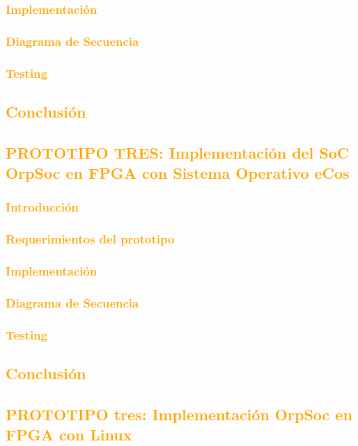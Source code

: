 \documentclass[a4paper,11pt]{article}
\begin{document}
		\subsubsection{\textcolor{orange}{Implementación}}
			\subsubsection{\textcolor{orange}{Diagrama de Secuencia}}
			\subsubsection{\textcolor{orange}{Testing}}
		\subsection{\textcolor{orange}{Conclusión}}
	\subsection{\textcolor{orange}{PROTOTIPO TRES: Implementación del SoC OrpSoc en FPGA con Sistema Operativo eCos}}
		\subsubsection{\textcolor{orange}{Introducción}}
		\subsubsection{\textcolor{orange}{Requerimientos del prototipo}}
		\subsubsection{\textcolor{orange}{Implementación}}
			\subsubsection{\textcolor{orange}{Diagrama de Secuencia}}
			\subsubsection{\textcolor{orange}{Testing}}
		\subsection{\textcolor{orange}{Conclusión}}
	\subsection{\textcolor{orange}{PROTOTIPO tres: Implementación OrpSoc en FPGA con Linux}}
\end{document}
